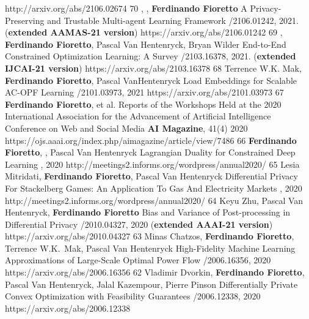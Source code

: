 \begin{pubs}
	{http://arxiv.org/abs/2106.02674}
\wsentry 
	{70}%
	{, , {\bf Ferdinando Fioretto}}
	{A Privacy-Preserving and Trustable Multi-agent Learning Framework}
	{/2106.01242, 2021. ({\bf extended AAMAS-21 version})}
	{https://arxiv.org/abs/2106.01242}
\wsentry %
	{69}%
	{, {\bf Ferdinando Fioretto}, Pascal Van Hentenryck, Bryan Wilder}
	{End-to-End Constrained Optimization Learning: A Survey}
	{/2103.16378, 2021. ({\bf extended IJCAI-21 version})}
	{https://arxiv.org/abs/2103.16378}
\wsentry 
	{68}%
	{Terrence W.K. Mak, {\bf Ferdinando Fioretto}, Pascal VanHentenryck}
	{Load Embeddings for Scalable AC-OPF Learning}
	{/2101.03973, 2021}
	{https://arxiv.org/abs/2101.03973}
\journalentry
	{67} %
	{{\bf Ferdinando Fioretto}, et al.} 
	{Reports of the Workshops Held at the 2020 International Association for the Advancement of Artificial Intelligence Conference on Web and Social Media}
	{{\bf AI Magazine},  41(4) 2020}
	{https://ojs.aaai.org/index.php/aimagazine/article/view/7486}
\wsentry 
	{66} %
	{{\bf Ferdinando Fioretto}, , Pascal Van Hentenryck}
	{Lagrangian Duality for Constrained Deep Learning}
	{, 2020}
	{http://meetings2.informs.org/wordpress/annual2020/}
\wsentry 
	{65} %
	{Lesia Mitridati, {\bf Ferdinando Fioretto}, Pascal Van Hentenryck}
	{Differential Privacy For Stackelberg Games: An Application To Gas And Electricity Markets}
	{, 2020}
	{http://meetings2.informs.org/wordpress/annual2020/}
\wsentry 
	{64}%
	{Keyu Zhu, Pascal Van Hentenryck, {\bf Ferdinando Fioretto}}
	{Bias and Variance of Post-processing in Differential Privacy}
	{/2010.04327, 2020 ({\bf extended AAAI-21 version})}
	{https://arxiv.org/abs/2010.04327}
\wsentry
	{63}%
	{Minas Chatzos, {\bf Ferdinando Fioretto}, Terrence W.K.~Mak, Pascal Van Hentenryck}
	{High-Fidelity Machine Learning Approximations of Large-Scale Optimal Power Flow}
	{/2006.16356, 2020}
	{https://arxiv.org/abs/2006.16356}
\wsentry
	{62}%
	{Vladimir Dvorkin, {\bf Ferdinando Fioretto}, Pascal Van Hentenryck, Jalal Kazempour, Pierre Pinson}
	{Differentially Private Convex Optimization with Feasibility Guarantees}
	{/2006.12338, 2020}
	{https://arxiv.org/abs/2006.12338}




\end{pubs}
